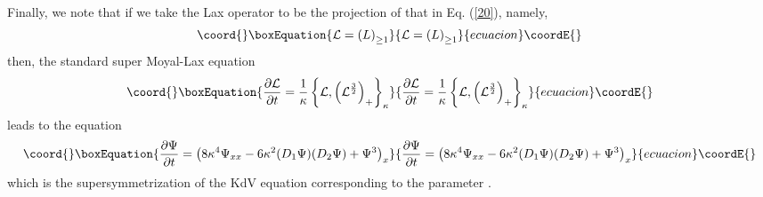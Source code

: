 \documentclass[a4paper,11pt]{article}
\begin{document}
Finally, we note that if we take the Lax operator to be the \coordHE{} projection of that in Eq. (\ref{20}), namely,
\begin{equation}\coord{}\boxEquation{
{\cal L} = \left(L\right)_{\geq 1}
}{
{\cal L} = \left(L\right)_{\geq 1}
}{ecuacion}\coordE{}\end{equation}
then, the standard super Moyal-Lax equation
\begin{equation}\coord{}\boxEquation{
{\partial {\cal L}\over \partial t} = {1\over \kappa} \left\{{\cal
L},\left({\cal L}^{3\over 2}\right)_{+}\right\}_{\kappa}
}{
{\partial {\cal L}\over \partial t} = {1\over \kappa} \left\{{\cal
L},\left({\cal L}^{3\over 2}\right)_{+}\right\}_{\kappa}
}{ecuacion}\coordE{}\end{equation}
leads to the equation
\begin{equation}\coord{}\boxEquation{
{\partial \Psi\over \partial t} = \left(8\kappa^{4} \Psi_{xx} -
6\kappa^{2} (D_{1}\Psi) (D_{2}\Psi) + \Psi^{3}\right)_{x}\label{b}
}{
{\partial \Psi\over \partial t} = \left(8\kappa^{4} \Psi_{xx} -
6\kappa^{2} (D_{1}\Psi) (D_{2}\Psi) + \Psi^{3}\right)_{x}}{ecuacion}\coordE{}\end{equation}
which is the \coordHE{} supersymmetrization of the KdV equation
corresponding to the parameter \coordHE{} \cite{3}.
\end{document}
